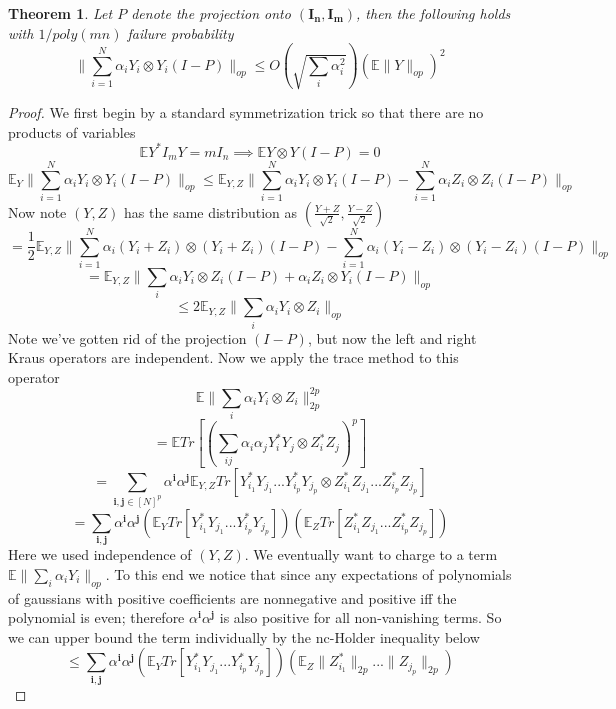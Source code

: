 \documentclass{article}
\newtheorem{theorem}{Theorem}
\renewcommand{\vec}{\bm}
\newcommand{\E}{\mathbb{E}}
\begin{document}
\begin{theorem}
Let $P$ denote the projection onto $(\vec{I_{n}},\vec{I_{m}})$, then the following holds with $1/poly(mn)$ failure probability
\[ \|\sum_{i=1}^{N} \alpha_{i} Y_{i} \otimes Y_{i} (I - P) \|_{op} \leq O \left( \sqrt{\sum_{i} \alpha_{i}^{2}} \right) \left( \E \|Y\|_{op} \right)^{2} \]
\end{theorem}
\begin{proof}
We first begin by a standard symmetrization trick so that there are no products of variables
\[\E Y^{*} I_{m} Y = m I_{n} \implies \E Y \otimes Y (I-P) = 0\]
\[ \E_{Y} \|\sum_{i=1}^{N} \alpha_{i} Y_{i} \otimes Y_{i} (I - P)\|_{op} \leq \E_{Y,Z} \|\sum_{i=1}^{N} \alpha_{i} Y_{i} \otimes Y_{i} (I - P) - \sum_{i=1}^{N} \alpha_{i} Z_{i} \otimes Z_{i} (I - P) \|_{op}  \]
Now note $(Y,Z)$ has the same distribution as $(\frac{Y+Z}{\sqrt{2}},\frac{Y-Z}{\sqrt{2}})$
\[ = \frac{1}{2}\E_{Y,Z} \|\sum_{i=1}^{N} \alpha_{i} (Y_{i}+Z_{i}) \otimes (Y_{i}+Z_{i}) (I - P) - \sum_{i=1}^{N} \alpha_{i} (Y_{i}-Z_{i}) \otimes (Y_{i}-Z_{i}) (I - P) \|_{op}  \]
\[ = \E_{Y,Z} \|\sum_{i} \alpha_{i} Y_{i} \otimes Z_{i} (I-P) + \alpha_{i} Z_{i} \otimes Y_{i} (I-P)\|_{op}  \]
\[ \leq 2 \E_{Y,Z} \|\sum_{i} \alpha_{i} Y_{i} \otimes Z_{i}\|_{op}   \]
Note we've gotten rid of the projection $(I-P)$, but now the left and right Kraus operators are independent. Now we apply the trace method to this operator
\[ \E \|\sum_{i} \alpha_{i} Y_{i} \otimes Z_{i}\|_{2p}^{2p} \]
\[ = \E Tr [ \left( \sum_{ij} \alpha_{i} \alpha_{j} Y_{i}^{*} Y_{j} \otimes Z_{i}^{*} Z_{j} \right)^{p} ]  \]
\[ = \sum_{\vec{i},\vec{j} \in [N]^{p}} \alpha^{\vec{i}} \alpha^{\vec{j}} \E_{Y,Z} Tr [ Y_{i_{1}}^{*} Y_{j_{1}} ... Y_{i_{p}}^{*} Y_{j_{p}} \otimes Z_{i_{1}}^{*} Z_{j_{1}} ... Z_{i_{p}}^{*} Z_{j_{p}}  ]   \]
\[ = \sum_{\vec{i},\vec{j}} \alpha^{\vec{i}} \alpha^{\vec{j}} (\E_{Y} Tr [ Y_{i_{1}}^{*} Y_{j_{1}} ... Y_{i_{p}}^{*} Y_{j_{p}} ] ) (\E_{Z} Tr [ Z_{i_{1}}^{*} Z_{j_{1}} ... Z_{i_{p}}^{*} Z_{j_{p}} ] )  \]
Here we used independence of $(Y,Z)$. We eventually want to charge to a term $\E \|\sum_{i} \alpha_{i} Y_{i}\|_{op}$. To this end we notice that since any expectations of polynomials of gaussians with positive coefficients are nonnegative and positive iff the polynomial is even; therefore $\alpha^{\vec{i}} \alpha^{\vec{j}}$ is also positive for all non-vanishing terms. So we can upper bound the term individually by the nc-Holder inequality below
\[ \leq  \sum_{\vec{i},\vec{j}} \alpha^{\vec{i}} \alpha^{\vec{j}} (\E_{Y} Tr [ Y_{i_{1}}^{*} Y_{j_{1}} ... Y_{i_{p}}^{*} Y_{j_{p}} ] ) ( \E_{Z} \|Z_{i_{1}}^{*}\|_{2p} ... \|Z_{j_{p}}\|_{2p} )  \]

\end{proof}
\end{document}
